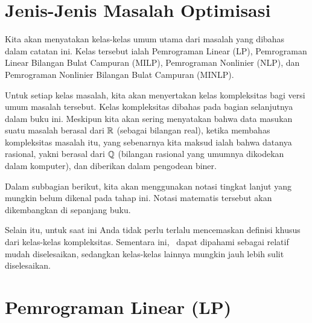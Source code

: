 \section{Jenis-Jenis Masalah Optimisasi}
\label{sec:types-of-optimization}
Kita akan menyatakan kelas-kelas umum utama dari masalah yang dibahas dalam catatan ini. Kelas tersebut ialah Pemrograman Linear (LP), Pemrograman Linear Bilangan Bulat Campuran (MILP), Pemrograman Nonlinier (NLP), dan Pemrograman Nonlinier Bilangan Bulat Campuran (MINLP).  

\begin{center}
\par{}\label{fig:tree-diagram-types}%

\end{center}

Untuk setiap kelas masalah, kita akan menyertakan kelas kompleksitas bagi versi umum masalah tersebut. Kelas kompleksitas dibahas pada bagian selanjutnya dalam buku ini. Meskipun kita akan sering menyatakan bahwa data masukan suatu masalah berasal dari ${\mathbb{R}}$ (sebagai bilangan real), ketika membahas kompleksitas masalah itu, yang sebenarnya kita maksud ialah bahwa datanya rasional, yakni berasal dari ${\mathbb{Q}}$ (bilangan rasional yang umumnya dikodekan dalam komputer), dan diberikan dalam pengodean biner.

\begin{warn}
Dalam subbagian berikut, kita akan menggunakan notasi tingkat lanjut yang mungkin belum dikenal pada tahap ini. Notasi matematis tersebut akan dikembangkan di sepanjang buku.

Selain itu, untuk saat ini Anda tidak perlu terlalu mencemaskan definisi khusus dari kelas-kelas kompleksitas. Sementara ini, \polynomial\ dapat dipahami sebagai relatif mudah diselesaikan, sedangkan kelas-kelas lainnya mungkin jauh lebih sulit diselesaikan.
\end{warn}

\section{Pemrograman Linear (LP)}
\label{sec:intro-LP}

